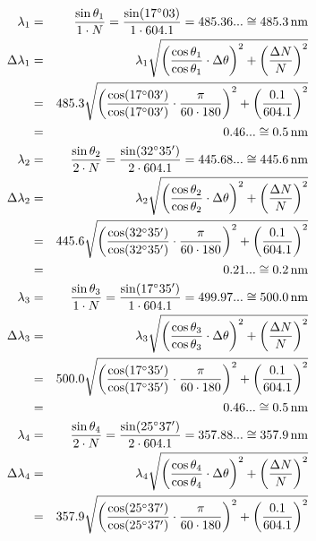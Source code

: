 \documentclass[a4j,10pt]{jarticle}
\begin{document}
  \begin{eqnarray*}
      \lambda_1        &=& \frac{ \sin \theta_1 }{1 \cdot N} = \frac{\sin(17^\circ03)}{1\cdot604.1} = 485.36... \cong 485.3\, {\rm nm} \\
      \Delta \lambda_1 &=& \lambda_1 \sqrt{ \left( \frac{\cos\theta_1}{\cos\theta_1} \cdot \Delta\theta \right)^2 + \left( \frac{\Delta N}{N} \right)^2 } \\
                        &=& 485.3 \sqrt{ \left( \frac{\cos(17^\circ03')}{\cos(17^\circ03')} \cdot \frac{\pi}{60\cdot180} \right)^2 + \left( \frac{0.1}{604.1} \right)^2 } \\
                        &=&0.46... \cong 0.5 \,{\rm nm} \\
      \lambda_2        &=& \frac{ \sin \theta_2 }{2 \cdot N} = \frac{\sin(32^\circ35')}{2\cdot604.1} = 445.68... \cong 445.6 \,{\rm nm} \\
      \Delta \lambda_2 &=& \lambda_2 \sqrt{ \left( \frac{\cos\theta_2}{\cos\theta_2} \cdot \Delta\theta \right)^2 + \left( \frac{\Delta N}{N} \right)^2 } \\
                        &=& 445.6 \sqrt{ \left( \frac{\cos(32^\circ35')}{\cos(32^\circ35')} \cdot \frac{\pi}{60\cdot180} \right)^2 + \left( \frac{0.1}{604.1} \right)^2 } \\
                        &=&0.21... \cong 0.2 \,{\rm nm} \\
      \lambda_3        &=& \frac{ \sin \theta_3 }{1 \cdot N} = \frac{\sin(17^\circ35')}{1\cdot604.1} = 499.97... \cong 500.0 \,{\rm nm} \\
      \Delta \lambda_3 &=& \lambda_3 \sqrt{ \left( \frac{\cos\theta_3}{\cos\theta_3} \cdot \Delta\theta \right)^2 + \left( \frac{\Delta N}{N} \right)^2 } \\
                        &=& 500.0 \sqrt{ \left( \frac{\cos(17^\circ35')}{\cos(17^\circ35')} \cdot \frac{\pi}{60\cdot180} \right)^2 + \left( \frac{0.1}{604.1} \right)^2 } \\
                        &=&0.46... \cong 0.5 \,{\rm nm} \\
      \lambda_4        &=& \frac{ \sin \theta_4 }{2 \cdot N} = \frac{\sin(25^\circ37')}{2\cdot604.1} = 357.88... \cong 357.9 \,{\rm nm} \\
      \Delta \lambda_4 &=& \lambda_4 \sqrt{ \left( \frac{\cos\theta_4}{\cos\theta_4} \cdot \Delta\theta \right)^2 + \left( \frac{\Delta N}{N} \right)^2 } \\
                        &=& 357.9 \sqrt{ \left( \frac{\cos(25^\circ37')}{\cos(25^\circ37')} \cdot \frac{\pi}{60\cdot180} \right)^2 + \left( \frac{0.1}{604.1} \right)^2 } \\

\end{eqnarray*}
\end{document}
